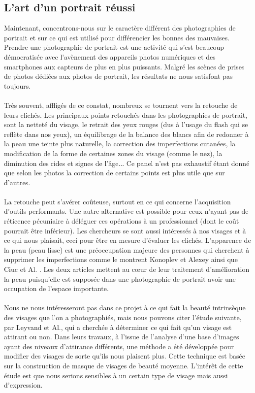 \documentclass[11pt, french]{report-rd-info}
\begin{document}
\subsection{L’art d’un portrait réussi}
Maintenant, concentrons-nous sur le caractère différent des photographies de portrait et sur ce qui est utilisé pour différencier les bonnes des mauvaises.
Prendre une photographie de portrait est une activité qui s'est beaucoup démocratisée avec l'avènement des appareils photos numériques et des smartphones aux capteurs de plus en plus puissants. Malgré les scènes de prises de photos dédiées aux photos de portrait, les résultats ne nous satisfont pas toujours.
\paragraph*{}
Très souvent, affligés de ce constat, nombreux se tournent vers la retouche de leurs clichés. Les principaux points retouchés dans les photographies de portrait, sont la netteté du visage, le retrait des yeux rouges (dus à l'usage du flash qui se reflète dans nos yeux), un équilibrage de la balance des blancs afin de redonner à la peau une teinte plus naturelle, la correction des imperfections cutanées, la modification de la forme de certaines zones du visage (comme le nez), la diminution des rides et signes de l'âge... Ce panel n'est pas exhaustif étant donné que selon les photos la correction de certains points est plus utile que sur d'autres.
\paragraph*{}
La retouche peut s'avérer coûteuse, surtout en ce qui concerne l'acquisition d'outils performants. Une autre alternative est possible pour ceux n'ayant pas de réticence pécuniaire à déléguer ces opérations à un professionnel (dont le coût pourrait être inférieur). Les chercheurs se sont aussi intéressés à nos visages et à ce qui nous plaisait, ceci pour être en mesure d'évaluer les clichés. L’apparence de la peau (peau lisse) est une préoccupation majeure des personnes qui cherchent à supprimer les imperfections comme le montrent Konoplev et Alexey \cite{Konoplev2012} ainsi que Ciuc et Al. \cite{Ciuc2010}. Les deux articles mettent au cœur de leur traitement d'amélioration la peau puisqu'elle est supposée dans une photographie de portrait avoir une occupation de l'espace importante.
\paragraph*{}
Nous ne nous intéresseront pas dans ce projet à ce qui fait la beauté intrinsèque des visages que l'on a photographiés, mais nous pouvons citer l'étude suivante, par Leyvand et Al.\cite{Leyvand2008}, qui a cherchée à déterminer ce qui fait qu'un visage est attirant ou non. Dans leurs travaux, à l'issue de l'analyse d'une base d'images ayant des niveaux d'attirance différents,  une méthode a été développée pour modifier des visages de sorte qu'ils nous plaisent plus. Cette technique est basée sur la construction de masque de visages de beauté moyenne. L'intérêt de cette étude est que nous serions sensibles à un certain type de visage mais aussi d'expression.
\end{document}
